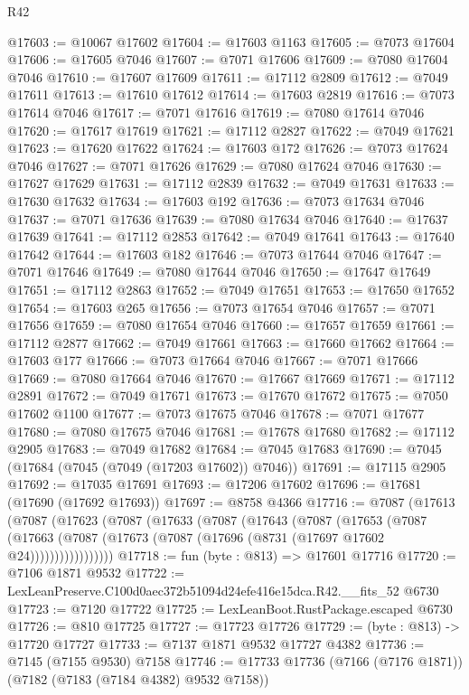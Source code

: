 \begin{lexlean}{R42}
\begin{coremodule}
{@17603 := @10067 @17602
@17604 := @17603 @1163
@17605 := @7073 @17604
@17606 := @17605 @7046
@17607 := @7071 @17606
@17609 := @7080 @17604 @7046
@17610 := @17607 @17609
@17611 := @17112 @2809
@17612 := @7049 @17611
@17613 := @17610 @17612
@17614 := @17603 @2819
@17616 := @7073 @17614 @7046
@17617 := @7071 @17616
@17619 := @7080 @17614 @7046
@17620 := @17617 @17619
@17621 := @17112 @2827
@17622 := @7049 @17621
@17623 := @17620 @17622
@17624 := @17603 @172
@17626 := @7073 @17624 @7046
@17627 := @7071 @17626
@17629 := @7080 @17624 @7046
@17630 := @17627 @17629
@17631 := @17112 @2839
@17632 := @7049 @17631
@17633 := @17630 @17632
@17634 := @17603 @192
@17636 := @7073 @17634 @7046
@17637 := @7071 @17636
@17639 := @7080 @17634 @7046
@17640 := @17637 @17639
@17641 := @17112 @2853
@17642 := @7049 @17641
@17643 := @17640 @17642
@17644 := @17603 @182
@17646 := @7073 @17644 @7046
@17647 := @7071 @17646
@17649 := @7080 @17644 @7046
@17650 := @17647 @17649
@17651 := @17112 @2863
@17652 := @7049 @17651
@17653 := @17650 @17652
@17654 := @17603 @265
@17656 := @7073 @17654 @7046
@17657 := @7071 @17656
@17659 := @7080 @17654 @7046
@17660 := @17657 @17659
@17661 := @17112 @2877
@17662 := @7049 @17661
@17663 := @17660 @17662
@17664 := @17603 @177
@17666 := @7073 @17664 @7046
@17667 := @7071 @17666
@17669 := @7080 @17664 @7046
@17670 := @17667 @17669
@17671 := @17112 @2891
@17672 := @7049 @17671
@17673 := @17670 @17672
@17675 := @7050 @17602 @1100
@17677 := @7073 @17675 @7046
@17678 := @7071 @17677
@17680 := @7080 @17675 @7046
@17681 := @17678 @17680
@17682 := @17112 @2905
@17683 := @7049 @17682
@17684 := @7045 @17683
@17690 := @7045 (@17684 (@7045 (@7049 (@17203 @17602)) @7046))
@17691 := @17115 @2905
@17692 := @17035 @17691
@17693 := @17206 @17602
@17696 := @17681 (@17690 (@17692 @17693))
@17697 := @8758 @4366
@17716 := @7087
    (@17613
      (@7087
        (@17623
          (@7087
            (@17633
              (@7087
                (@17643
                  (@7087
                    (@17653
                      (@7087
                        (@17663
                          (@7087 (@17673 (@7087 (@17696 (@8731 (@17697 @17602 @24)))))))))))))))))
@17718 := fun (byte : @813) => @17601 @17716
@17720 := @7106 @1871 @9532
@17722 := LexLeanPreserve.C100d0aec372b51094d24efe416e15dca.R42.__fits_52 @6730
@17723 := @7120 @17722
@17725 := LexLeanBoot.RustPackage.escaped @6730
@17726 := @810 @17725
@17727 := @17723 @17726
@17729 := (byte : @813) -> @17720 @17727
@17733 := @7137 @1871 @9532 @17727 @4382
@17736 := @7145 (@7155 @9530) @7158
@17746 := @17733 @17736 (@7166 (@7176 @1871)) (@7182 (@7183 (@7184 @4382) @9532 @7158))
}
\end{coremodule}
\end{lexlean}
